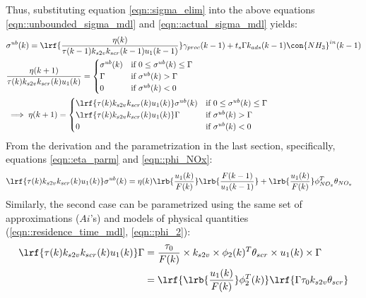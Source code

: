 Thus, substituting equation \ref{eqn::sigma_elim} into the above equations \ref{eqn::unbounded_sigma_mdl} and \ref{eqn::actual_sigma_mdl} yields:
\begin{align}
        &\sigma^{ub}(k) = \lrf{\frac{\eta(k)}{\tau(k-1) k_{s2v} k_{scr}(k-1) u_1(k-1)}} \gamma_{proc}(k-1) + t_s \Gamma k_{ads}(k-1) \con{NH_3}^{in}(k-1)\\
        &\frac{\eta(k+1)}{\tau(k) k_{s2v} k_{scr}(k) u_1(k)} =
        \begin{cases}
                                \sigma^{ub}(k)     & \text{if }  0 \leq \sigma^{ub}(k) \leq \Gamma\\
                                \Gamma             & \text{if }  \sigma^{ub}(k) > \Gamma \\
                                0                  & \text{if }  \sigma^{ub}(k) < 0
        \end{cases} \\
        &\implies \eta(k+1) =
        \begin{cases}
        \lrf{\tau(k) k_{s2v} k_{scr}(k) u_1(k)}\sigma^{ub}(k)         & \text{if }
                0 \leq \sigma^{ub}(k) \leq \Gamma\\
        \lrf{\tau(k) k_{s2v} k_{scr}(k) u_1(k)} \Gamma                & \text{if }
                \sigma^{ub}(k) > \Gamma \\
        0                                                             & \text{if }
                \sigma^{ub}(k) < 0
        \end{cases}
        \label{eqn::eta_cases_physical}
\end{align}
From the derivation and the parametrization in the last section, specifically, equations \ref{eqn::eta_parm} and
\ref{eqn::phi_NOx}:
\begin{align}
        \lrf{\tau(k) k_{s2v} k_{scr}(k) u_1(k)}\sigma^{ub}(k) &=
        \eta(k) \lrb{\frac{u_1(k)}{F(k)}} \lrb{\frac{F(k-1)}{u_1(k-1)}}
        +\lrb{\frac{u_1(k)}{F(k)}} \phi_{NO_x}^T \theta_{NO_x}
        \label{eqn::sigma_ub_param}
\end{align}
Similarly, the second case can be parametrized using the same set of approximations ($Ai$'s) and models of physical quantities (\ref{eqn::residence_time_mdl}, \ref{eqn::phi_2}):
\begin{align*}
        \lrf{\tau(k) k_{s2v} k_{scr}(k) u_1(k)} \Gamma  &= \frac{\tau_0}{F(k)} \times k_{s2v} \times \phi_2(k)^T \theta_{scr} \times u_1(k) \times \Gamma\\
        &= \lrf{\lrb{\frac{u_1(k)}{F(k)}} \phi_2^T(k) } \lrf{\Gamma \tau_0 k_{s2v} \theta_{scr}}
\end{align*}
